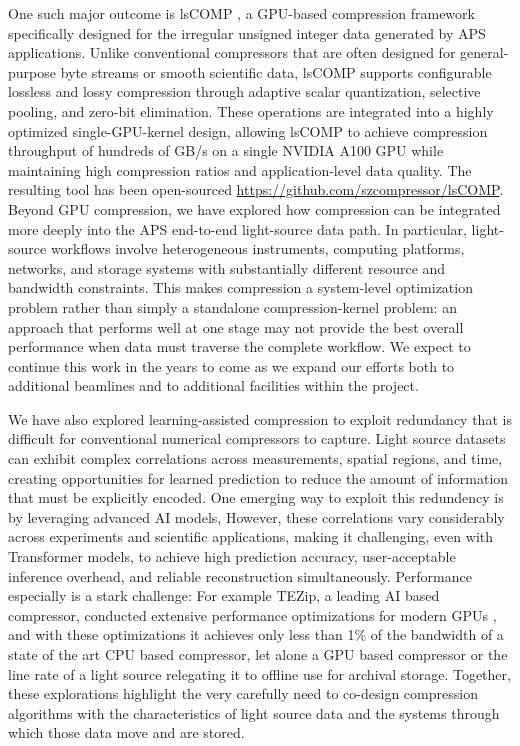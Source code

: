 One such major outcome is lsCOMP \cite{huangLsCOMPEfficientLight2025}, a GPU-based compression framework specifically designed for the irregular unsigned integer data generated by APS applications. 
Unlike conventional compressors that are often designed for general-purpose byte streams or smooth scientific data, lsCOMP supports configurable lossless and lossy compression through adaptive scalar quantization, selective pooling, and zero-bit elimination. 
These operations are integrated into a highly optimized single-GPU-kernel design, allowing lsCOMP to achieve compression throughput of hundreds of GB/s on a single NVIDIA A100 GPU while maintaining high compression ratios and application-level data quality. 
The resulting tool has been open-sourced \url{https://github.com/szcompressor/lsCOMP}.
Beyond GPU compression, we have explored how compression can be integrated more deeply into the APS end-to-end light-source data path. 
In particular, light-source workflows involve heterogeneous instruments, computing platforms, networks, and storage systems with substantially different resource and bandwidth constraints. 
This makes compression a system-level optimization problem rather than simply a standalone compression-kernel problem: an approach that performs well at one stage may not provide the best overall performance when data must traverse the complete workflow.
We expect to continue this work in the years to come as we expand our efforts both to additional beamlines and to additional facilities within the project.

We have also explored learning-assisted compression to exploit redundancy that is difficult for conventional numerical compressors to capture. 
Light source datasets can exhibit complex correlations across measurements, spatial regions, and time, creating opportunities for learned prediction to reduce the amount of information that must be explicitly encoded. 
One emerging way to exploit this redundency is by leveraging advanced AI models, However, these correlations vary considerably across experiments and scientific applications, making it challenging, even with Transformer models, to achieve high prediction accuracy, user-acceptable inference overhead, and reliable reconstruction simultaneously. 
Performance especially is a stark challenge:  For example TEZip, a leading AI based compressor, conducted extensive performance optimizations for modern GPUs \cite{nambudiripadDevelopmentTEZipPyTorch}, and with these optimizations it achieves only less than 1\% of the bandwidth of a state of the art CPU based compressor, let alone a GPU based compressor or the line rate of a light source relegating it to offline use for archival storage.
Together, these explorations highlight the very carefully need to co-design compression algorithms with the characteristics of light source data and the systems through which those data move and are stored.

